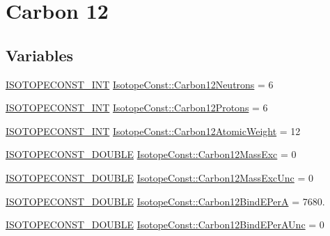 \hypertarget{group___isotope_const-_carbon-_c12}{}\section{Carbon 12}
\label{group___isotope_const-_carbon-_c12}
\subsection*{Variables}
\begin{DoxyCompactItemize}
\item 
\mbox{\hyperlink{group___isotope_const-_macros_ga5f18360b3e99483a35c32d789e62621c}{I\+S\+O\+T\+O\+P\+E\+C\+O\+N\+S\+T\+\_\+\+I\+NT}} \mbox{\hyperlink{group___isotope_const-_carbon-_c12_ga3f2fcf3728766f39166e48e297d9f51f}{Isotope\+Const\+::\+Carbon12\+Neutrons}} = 6
\item 
\mbox{\hyperlink{group___isotope_const-_macros_ga5f18360b3e99483a35c32d789e62621c}{I\+S\+O\+T\+O\+P\+E\+C\+O\+N\+S\+T\+\_\+\+I\+NT}} \mbox{\hyperlink{group___isotope_const-_carbon-_c12_ga6adb9f6c008cb3ae288b0848106507bb}{Isotope\+Const\+::\+Carbon12\+Protons}} = 6
\item 
\mbox{\hyperlink{group___isotope_const-_macros_ga5f18360b3e99483a35c32d789e62621c}{I\+S\+O\+T\+O\+P\+E\+C\+O\+N\+S\+T\+\_\+\+I\+NT}} \mbox{\hyperlink{group___isotope_const-_carbon-_c12_ga55d02afb466b5d3c3489a520d5cea78e}{Isotope\+Const\+::\+Carbon12\+Atomic\+Weight}} = 12
\item 
\mbox{\hyperlink{group___isotope_const-_macros_ga8f45a7272ce02c0b4c65c44636ed719a}{I\+S\+O\+T\+O\+P\+E\+C\+O\+N\+S\+T\+\_\+\+D\+O\+U\+B\+LE}} \mbox{\hyperlink{group___isotope_const-_carbon-_c12_gabfd0a0281a9c8d2030693f3501a9afb4}{Isotope\+Const\+::\+Carbon12\+Mass\+Exc}} = 0
\item 
\mbox{\hyperlink{group___isotope_const-_macros_ga8f45a7272ce02c0b4c65c44636ed719a}{I\+S\+O\+T\+O\+P\+E\+C\+O\+N\+S\+T\+\_\+\+D\+O\+U\+B\+LE}} \mbox{\hyperlink{group___isotope_const-_carbon-_c12_ga928f6a531842b72d8311cdb55b580b29}{Isotope\+Const\+::\+Carbon12\+Mass\+Exc\+Unc}} = 0
\item 
\mbox{\hyperlink{group___isotope_const-_macros_ga8f45a7272ce02c0b4c65c44636ed719a}{I\+S\+O\+T\+O\+P\+E\+C\+O\+N\+S\+T\+\_\+\+D\+O\+U\+B\+LE}} \mbox{\hyperlink{group___isotope_const-_carbon-_c12_gaea68a91d633bd5165d0dc6180ac1e5be}{Isotope\+Const\+::\+Carbon12\+Bind\+E\+PerA}} = 7680.
\item 
\mbox{\hyperlink{group___isotope_const-_macros_ga8f45a7272ce02c0b4c65c44636ed719a}{I\+S\+O\+T\+O\+P\+E\+C\+O\+N\+S\+T\+\_\+\+D\+O\+U\+B\+LE}} \mbox{\hyperlink{group___isotope_const-_carbon-_c12_gabd9e3915b7688850cb51ca29de46271c}{Isotope\+Const\+::\+Carbon12\+Bind\+E\+Per\+A\+Unc}} = 0

\end{DoxyCompactItemize}
